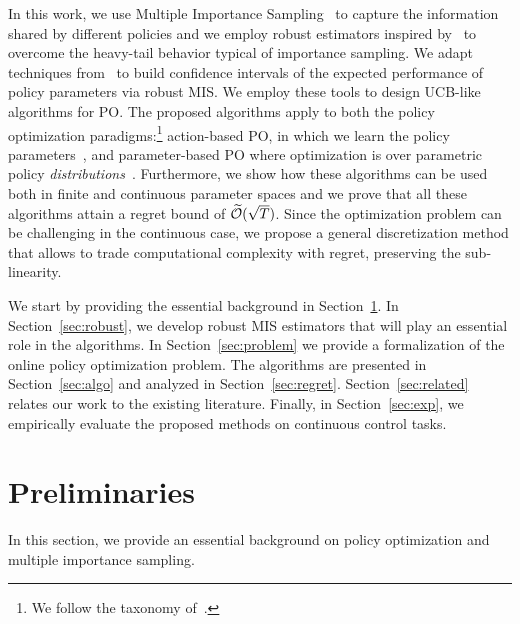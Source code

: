 \documentclass{article}
\begin{document}
In this work, we use Multiple Importance Sampling~\citep[MIS,][]{veach_optimally_1995} to capture the information shared by different policies and we employ robust estimators inspired by~\citet{bubeck2013bandits} to overcome the heavy-tail behavior typical of importance sampling. We adapt techniques from~\citet{metelli2018policy} to build confidence intervals of the expected performance of policy parameters via robust MIS.
We employ these tools to design UCB-like algorithms for PO. The proposed algorithms apply to both the policy optimization paradigms:\footnote{We follow the taxonomy of~\citet{metelli2018policy}.} action-based PO, in which we learn the policy parameters~\cite{sutton2000policy}, and parameter-based PO where optimization is over parametric policy \textit{distributions}~\cite{sehnke2008policy}. Furthermore, we show how these algorithms can be used both in finite and continuous parameter spaces and we prove that all these algorithms attain a regret bound of $\widetilde{\mathcal{O}}(\sqrt{T})$. Since the optimization problem can be challenging in the continuous case, we propose a general discretization method that allows to trade computational complexity with regret, preserving the sub-linearity.

We start by providing the essential background in Section~\ref{sec:pre}. In Section~\ref{sec:robust}, we develop robust MIS estimators that will play an essential role in the algorithms. In Section~\ref{sec:problem} we provide a formalization of the online policy optimization problem. The algorithms are presented in Section~\ref{sec:algo} and analyzed in Section~\ref{sec:regret}. Section~\ref{sec:related} relates our work to the existing literature. Finally, in Section~\ref{sec:exp}, we empirically evaluate the proposed methods on continuous control tasks.

\section{Preliminaries}\label{sec:pre}
In this section, we provide an essential background on policy optimization and multiple importance sampling.
\end{document}
